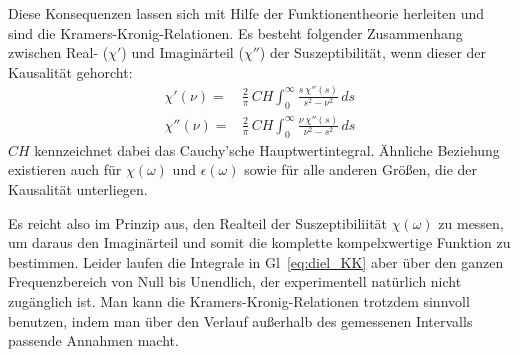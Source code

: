 Diese Konsequenzen lassen sich mit Hilfe der Funktionentheorie herleiten und sind die Kramers-Kronig-Relationen. Es besteht folgender Zusammenhang zwischen Real- ($\chi'$) und Imaginärteil  ($\chi''$) der Suszeptibilität, wenn dieser der Kausalität gehorcht:
\begin{align}
 \chi'(\nu) = & \frac{2}{\pi} \, CH \int_0^\infty \frac{s  \, \chi''(s)}{s^2 - \nu^2} \, ds \\
 \chi''(\nu) = & \frac{2}{\pi}\,  CH \int_0^\infty \frac{\nu \, \chi''(s)}{\nu^2 - s^2} \, ds 
 \label{eq:diel_KK}
\end{align}
$CH$ kennzeichnet dabei das Cauchy'sche Hauptwertintegral. Ähnliche Beziehung existieren auch für $\chi(\omega)$ und $\epsilon(\omega)$ sowie für alle anderen Größen, die der Kausalität unterliegen.

Es reicht also im Prinzip aus, den Realteil der Suszeptibiliität $\chi(\omega)$ zu messen, um daraus den Imaginärteil und somit die komplette kompelxwertige Funktion zu bestimmen. Leider laufen die Integrale in Gl~\ref{eq:diel_KK} aber über den ganzen Frequenzbereich von Null bis Unendlich, der experimentell natürlich nicht zugänglich ist. Man kann die Kramers-Kronig-Relationen trotzdem sinnvoll benutzen, indem man über den Verlauf außerhalb des gemessenen Intervalls passende Annahmen macht.




\printbibliography[segment=\therefsegment,heading=subbibliography]
